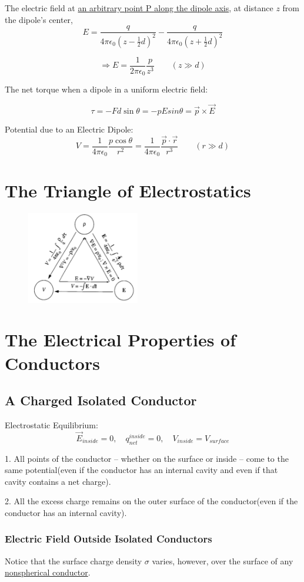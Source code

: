 \documentclass[11pt, a4paper]{article}
\begin{document}
The electric field at \underline{an arbitrary point P along the dipole axis}, at distance $z$ from the dipole’s center,
$$E=\frac q{4\pi\epsilon_0(z-\frac12d)^2}-\frac q{4\pi\epsilon_0(z+\frac12d)^2}$$

$$\Longrightarrow E=\frac1{2\pi\epsilon_0}\frac p{z^3} \qquad(z \gg d)$$

The net torque when a dipole in a uniform electric field:

$$\tau=-Fd\sin\theta=-pEsin\theta = \vec{p}\times \vec{E}$$

Potential due to an Electric Dipole:
$$V=\frac1{4\pi\epsilon_0}\frac{p\cos\theta}{r^2}=\frac1{4\pi\epsilon_0}\frac{\vec{p}\cdot\vec{r}}{r^3}\qquad(r\gg d)$$


\section{The Triangle of Electrostatics}

\begin{figure}[htbp]
    \centering
    \includegraphics[height = 4cm]{8.png}
\end{figure}

\section{The Electrical Properties of Conductors}
\subsection{A Charged Isolated Conductor}
Electrostatic Equilibrium: 
$$\boxed{\vec{E}_{inside} = 0,\quad q_{net}^{inside} = 0,\quad V_{inside} = V_{surface}}$$

1. All points of the conductor – whether on the surface or
inside – come to the same potential(even if the conductor has an internal cavity
and even if that cavity contains a net charge).

2. All the excess charge remains on the outer surface of the conductor(even if the conductor has an internal cavity).

\subsubsection{Electric Field Outside Isolated Conductors}
Notice that the surface charge density $\sigma$ varies, however, over the
surface of any \underline{nonspherical conductor}.
\end{document}
